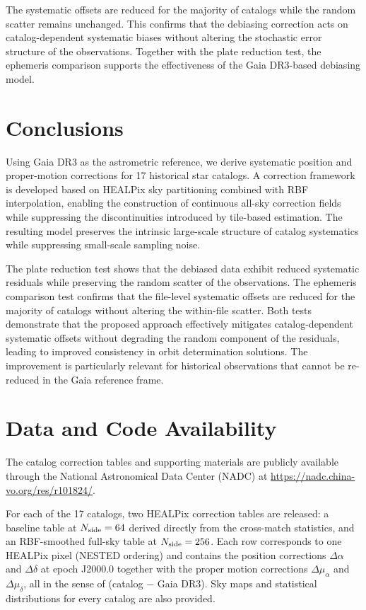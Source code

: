 \documentclass[linenumbers,amsmath,manuscript]{aastex702}
\begin{document}
The systematic offsets are reduced for the majority of catalogs while the random scatter remains unchanged. This confirms that the debiasing correction acts on catalog-dependent systematic biases without altering the stochastic error structure of the observations. Together with the plate reduction test, the ephemeris comparison supports the effectiveness of the Gaia DR3-based debiasing model.

\section{Conclusions} \label{sec:conclusions}

Using Gaia DR3 as the astrometric reference, we derive systematic position and proper-motion corrections for 17 historical star catalogs. A correction framework is developed based on HEALPix sky partitioning combined with RBF interpolation, enabling the construction of continuous all-sky correction fields while suppressing the discontinuities introduced by tile-based estimation. The resulting model preserves the intrinsic large-scale structure of catalog systematics while suppressing small-scale sampling noise.

The plate reduction test shows that the debiased data exhibit reduced systematic residuals while preserving the random scatter of the observations. The ephemeris comparison test confirms that the file-level systematic offsets are reduced for the majority of catalogs without altering the within-file scatter. Both tests demonstrate that the proposed approach effectively mitigates catalog-dependent systematic offsets without degrading the random component of the residuals, leading to improved consistency in orbit determination solutions. The improvement is particularly relevant for historical observations that cannot be re-reduced in the Gaia reference frame.

\section{Data and Code Availability} \label{sec:data}

The catalog correction tables and supporting materials are publicly available through the National Astronomical Data Center (NADC) at \url{https://nadc.china-vo.org/res/r101824/}.

For each of the 17 catalogs, two HEALPix correction tables are released: a baseline table at $N_{\rm side}=64$ derived directly from the cross-match statistics, and an RBF-smoothed full-sky table at $N_{\rm side}=256$. Each row corresponds to one HEALPix pixel (NESTED ordering) and contains the position corrections $\Delta\alpha$ and $\Delta\delta$ at epoch J2000.0 together with the proper motion corrections $\Delta\mu_\alpha$ and $\Delta\mu_\delta$, all in the sense of (catalog $-$ Gaia DR3). Sky maps and statistical distributions for every catalog are also provided.
\end{document}
